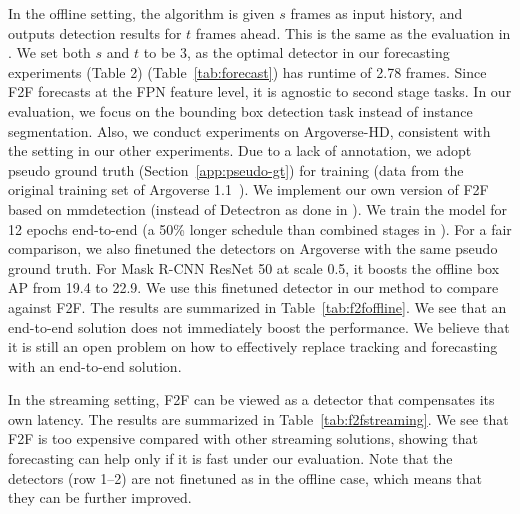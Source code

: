 In the offline setting, the algorithm is given $s$ frames as input history, and outputs detection results for $t$ frames ahead. This is the same as the evaluation in \cite{Luc2018PredictingFI}. We set both $s$ and $t$ to be 3, as the optimal detector in our forecasting experiments
\ifstandalonesupplement
    (Table 2)
\else
    (Table~\ref{tab:forecast})
\fi
has runtime of 2.78 frames. Since F2F forecasts at the FPN feature level, it is agnostic to second stage tasks. In our evaluation, we focus on the bounding box detection task instead of instance segmentation. Also, we conduct experiments on Argoverse-HD, consistent with the setting in our other experiments. Due to a lack of annotation, we adopt pseudo ground truth (Section~\ref{app:pseudo-gt}) for training (data from the original training set of Argoverse 1.1~\cite{Argoverse}). We implement our own version of F2F based on mmdetection (instead of Detectron as done in \cite{Luc2018PredictingFI}). We train the model for 12 epochs end-to-end (a 50\% longer schedule than combined stages in \cite{Luc2018PredictingFI}). For a fair comparison, we also finetuned the detectors on Argoverse with the same pseudo ground truth. For Mask R-CNN ResNet 50 at scale 0.5, it boosts the offline box AP from 19.4 to 22.9. We use this finetuned detector in our method to compare against F2F. The results are summarized in Table~\ref{tab:f2foffline}. We see that an end-to-end solution does not immediately boost the performance. We believe that it is still an open problem on how to effectively replace tracking and forecasting with an end-to-end solution.

In the streaming setting, 
F2F can be viewed as a detector that compensates its own latency. The results are summarized in Table~\ref{tab:f2fstreaming}. We see that F2F is too expensive compared with other streaming solutions, showing that forecasting can help only if it is fast under our evaluation. Note that the detectors (row 1--2) are not finetuned as in the offline case, which means that they can be further improved.


